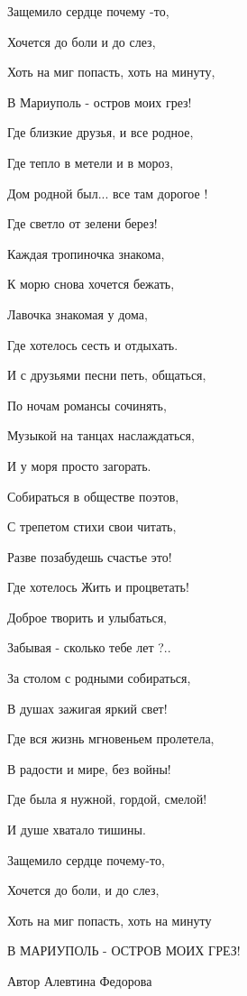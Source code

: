 Защемило  сердце  почему  -то,\par
Хочется  до  боли  и  до  слез,\par
Хоть  на  миг   попасть,  хоть  на  минуту,\par
В  Мариуполь  -  остров  моих  грез!\par
Где  близкие  друзья,  и  все  родное,\par
Где  тепло  в  метели  и  в  мороз,\par
Дом  родной  был...  все  там  дорогое !\par
Где светло  от  зелени  берез!\par
Каждая  тропиночка  знакома,\par
К морю  снова  хочется  бежать,\par
Лавочка  знакомая  у  дома,\par
Где  хотелось  сесть  и  отдыхать.\par
И  с  друзьями  песни  петь,  общаться,\par
По  ночам  романсы   сочинять,\par
Музыкой  на  танцах  наслаждаться,\par
И  у  моря  просто  загорать.\par
Собираться  в  обществе  поэтов,\par
С  трепетом  стихи  свои  читать,\par
Разве  позабудешь  счастье  это!\par
Где  хотелось  Жить  и  процветать!\par
Доброе  творить  и  улыбаться,\par
Забывая - сколько  тебе  лет  ?..\par
За  столом  с  родными  собираться,\par
В  душах  зажигая  яркий  свет!\par
Где  вся  жизнь  мгновеньем  пролетела,\par
В  радости  и  мире,  без  войны!\par
Где  была  я  нужной,  гордой,  смелой!\par
И  душе  хватало  тишины.\par
Защемило  сердце  почему-то,\par
Хочется  до  боли,  и  до  слез,\par
Хоть  на  миг  попасть,  хоть  на  минуту\par
В  МАРИУПОЛЬ  -  ОСТРОВ  МОИХ   ГРЕЗ!\par
Автор  Алевтина  Федорова\par

